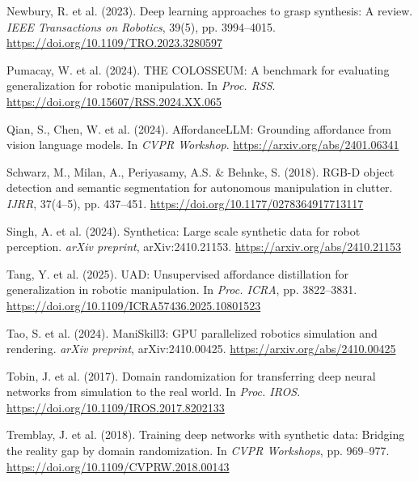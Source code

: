 \documentclass[11pt,a4paper]{article}
\begin{document}
\begin{enumerate}[label={[\arabic*]}, leftmargin=1.2cm, itemsep=3pt]
\item Newbury, R. et al. (2023). Deep learning approaches to grasp synthesis: A review. \textit{IEEE Transactions on Robotics}, 39(5), pp. 3994--4015. \href{https://doi.org/10.1109/TRO.2023.3280597}{https://doi.org/10.1109/TRO.2023.3280597}

\item Pumacay, W. et al. (2024). THE COLOSSEUM: A benchmark for evaluating generalization for robotic manipulation. In \textit{Proc. RSS}. \href{https://doi.org/10.15607/RSS.2024.XX.065}{https://doi.org/10.15607/RSS.2024.XX.065}

\item Qian, S., Chen, W. et al. (2024). AffordanceLLM: Grounding affordance from vision language models. In \textit{CVPR Workshop}. \href{https://arxiv.org/abs/2401.06341}{https://arxiv.org/abs/2401.06341}

\item Schwarz, M., Milan, A., Periyasamy, A.S. \& Behnke, S. (2018). RGB-D object detection and semantic segmentation for autonomous manipulation in clutter. \textit{IJRR}, 37(4--5), pp. 437--451. \href{https://doi.org/10.1177/0278364917713117}{https://doi.org/10.1177/0278364917713117}

\item Singh, A. et al. (2024). Synthetica: Large scale synthetic data for robot perception. \textit{arXiv preprint}, arXiv:2410.21153. \href{https://arxiv.org/abs/2410.21153}{https://arxiv.org/abs/2410.21153}

\item Tang, Y. et al. (2025). UAD: Unsupervised affordance distillation for generalization in robotic manipulation. In \textit{Proc. ICRA}, pp. 3822--3831. \href{https://doi.org/10.1109/ICRA57436.2025.10801523}{https://doi.org/10.1109/ICRA57436.2025.10801523}

\item Tao, S. et al. (2024). ManiSkill3: GPU parallelized robotics simulation and rendering. \textit{arXiv preprint}, arXiv:2410.00425. \href{https://arxiv.org/abs/2410.00425}{https://arxiv.org/abs/2410.00425}

\item Tobin, J. et al. (2017). Domain randomization for transferring deep neural networks from simulation to the real world. In \textit{Proc. IROS}. \href{https://doi.org/10.1109/IROS.2017.8202133}{https://doi.org/10.1109/IROS.2017.8202133}

\item Tremblay, J. et al. (2018). Training deep networks with synthetic data: Bridging the reality gap by domain randomization. In \textit{CVPR Workshops}, pp. 969--977. \href{https://doi.org/10.1109/CVPRW.2018.00143}{https://doi.org/10.1109/CVPRW.2018.00143}


\end{enumerate}
\end{document}

